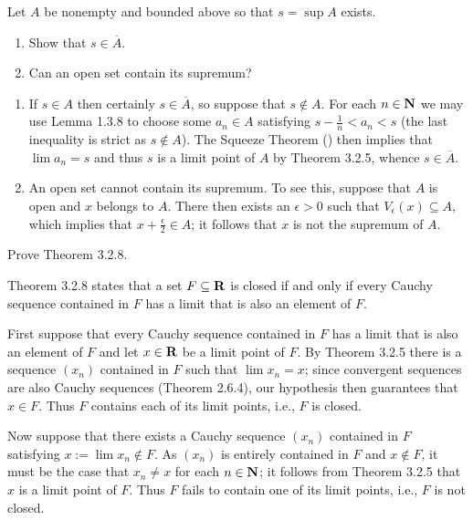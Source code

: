 \documentclass{lew98_solutions}
\begin{document}
\begin{exercise}
\label{ex:3.2.4}
    Let \( A \) be nonempty and bounded above so that \( s = \sup A \) exists.
    \begin{enumerate}
        \item Show that \( s \in \overline{A} \).

        \item Can an open set contain its supremum?
    \end{enumerate}
\end{exercise}

\begin{solution}
    \begin{enumerate}
        \item If \( s \in A \) then certainly \( s \in \overline{A} \), so suppose that \( s \not\in A \). For each \( n \in \mathbf{N} \) we may use Lemma 1.3.8 to choose some \( a_n \in A \) satisfying \( s - \tfrac{1}{n} < a_n < s \) (the last inequality is strict as \( s \not\in A \)). The Squeeze Theorem () then implies that \( \lim a_n = s \) and thus \( s \) is a limit point of \( A \) by Theorem 3.2.5, whence \( s \in \overline{A} \).

        \item An open set cannot contain its supremum. To see this, suppose that \( A \) is open and \( x \) belongs to \( A \). There then exists an \( \epsilon > 0 \) such that \( V_{\epsilon}(x) \subseteq A \), which implies that \( x + \tfrac{\epsilon}{2} \in A \); it follows that \( x \) is not the supremum of \( A \).
    \end{enumerate}
\end{solution}

\begin{exercise}
\label{ex:3.2.5}
    Prove Theorem 3.2.8.
\end{exercise}

\begin{solution}
    Theorem 3.2.8 states that a set \( F \subseteq \mathbf{R} \) is closed if and only if every Cauchy sequence contained in \( F \) has a limit that is also an element of \( F \). 
    
    First suppose that every Cauchy sequence contained in \( F \) has a limit that is also an element of \( F \) and let \( x \in \mathbf{R} \) be a limit point of \( F \). By Theorem 3.2.5 there is a sequence \( (x_n) \) contained in \( F \) such that \( \lim x_n = x \); since convergent sequences are also Cauchy sequences (Theorem 2.6.4), our hypothesis then guarantees that \( x \in F \). Thus \( F \) contains each of its limit points, i.e., \( F \) is closed.

    Now suppose that there exists a Cauchy sequence \( (x_n) \) contained in \( F \) satisfying \( x := \lim x_n \not\in F \). As \( (x_n) \) is entirely contained in \( F \) and \( x \not\in F \), it must be the case that \( x_n \neq x \) for each \( n \in \mathbf{N} \); it follows from Theorem 3.2.5 that \( x \) is a limit point of \( F \). Thus \( F \) fails to contain one of its limit points, i.e., \( F \) is not closed.
\end{solution}
\end{document}
